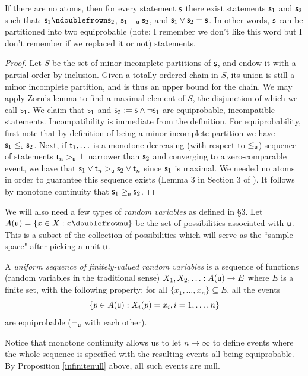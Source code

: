 \documentclass[11pt]{article}
\begin{document}
\begin{prop}
\label{split}
If there are no atoms, then for every statement $\stmt$ there exist statements $\stmt_1$ and $\stmt_2$ such that: $\stmt_1\ncomp \stmt_2$, $\stmt_1\equ\stmt_2$, and $\stmt_1\OR\stmt_2 = \stmt$. In other words, $\stmt$ can be partitioned into two equiprobable (note: I remember we don't like this word but I don't remember if we replaced it or not) statements. 
\end{prop}
\begin{proof}
Let $S$ be the set of minor incomplete partitions of $\stmt$, and endow it with a partial order by inclusion. Given a totally ordered chain in $S$, its union is still a minor incomplete partition, and is thus an upper bound for the chain. We may apply Zorn's lemma to find a maximal element of $S$, the disjunction of which we call $\stmt_1$. We claim that $\stmt_1$ and $\stmt_2:= \stmt\AND\NOT\stmt_1$ are equiprobable, incompatible statements. Incompatibility is immediate from the definition. For equiprobability, first note that by definition of being a minor incomplete partition we have $\stmt_1\lequ\stmt_2$. Next, if $\stmt[t]_1,\ldots$ is a monotone decreasing (with respect to $\lequ$) sequence of statements $\stmt[t]_n>_{\stmt[u]}\impossibility$ narrower than $\stmt_2$ and converging to a zero-comparable event, we have that $\stmt_1\OR\stmt[t]_n>_{\stmt[u]}\stmt_2\OR\stmt[t]_n$ since $\stmt_1$ is maximal. We needed no atoms in order to guarantee this sequence exists (Lemma 3 in Section 3 of \cite{villegas}). It follows by monotone continuity that $\stmt_1\geq_{\stmt[u]} \stmt_2$. 
\end{proof}

We will also need a few types of \emph{random variables} as defined in \cite{villegas} \S3. Let $A({\stmt[u]}) = \{x \in X : x \comp \stmt[u]\}$ be the set of possibilities associated with $\stmt[u]$. This is a subset of the collection of possibilities which will serve as the ``sample space" after picking a unit $\stmt[u]$.

A \emph{uniform sequence of finitely-valued random variables} is a sequence of functions (random variables in the traditional sense) $X_1,X_2,\ldots: A({\stmt[u]})\to E$ where $E$ is a finite set, with the following property: for all $\{x_1,\ldots,x_n\}\subseteq E$, all the events $$\{p\in A({\stmt[u]}): X_i(p) = x_i, i=1,\ldots,n\}$$
are equiprobable ($\equ$ with each other). 

Notice that monotone continuity allows us to let $n\to\infty$ to define events where the whole sequence is specified with the resulting events all being equiprobable. By Proposition \ref{infinitenull} above, all such events are null.
\end{document}
